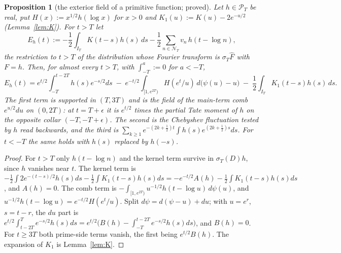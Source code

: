 \documentclass[11pt]{amsart}
\newtheorem{proposition}[theorem]{Proposition}
\theoremstyle{definition}
\theoremstyle{remark}
\newcommand{\PT}{\mathcal P_T}
\newcommand{\IT}{I_T}
\newcommand{\sT}{\sigma_T}
\newcommand{\Fh}{\widehat F}
\newcommand{\NT}{\mathcal N_T}
\begin{document}
\begin{proposition}[the exterior field of a primitive function; proved]\label{prop:shape-ext}
Let $h\in\PT$ be real, put $H(x):=x^{1/2}h(\log x)$ for $x>0$ and $K_1(u):=K(u)-2e^{-u/2}$ (Lemma~\ref{lem:K}). For $t>T$ let
\[
E_h(t):=-\frac12\int_{\IT}K(t-s)h(s)\,ds-\frac12\sum_{n\in\NT}v_n\,h(t-\log n),
\]
the restriction to $t>T$ of the distribution whose Fourier transform is $\sT\Fh$ with $F=h$. Then, for almost every $t>T$, with $\int_{-T}^{a}:=0$ for $a<-T$,
\[
E_h(t)=e^{t/2}\int_{-T}^{t-2T}h(s)e^{-s/2}ds\;-\;e^{-t/2}\int_{[1,e^{2T})}H(e^t/u)\,d\big(\psi(u)-u\big)\;-\;\frac12\int_{\IT}K_1(t-s)h(s)\,ds .
\]
The first term is supported in $(T,3T)$ and is the field of the main-term comb $e^{u/2}du$ on $(0,2T)$: at $t=T+\epsilon$ it is
$e^{t/2}$ times the partial Tate moment of $h$ on the opposite collar $(-T,-T+\epsilon)$. The second is the Chebyshev fluctuation tested
by $h$ read backwards, and the third is $\sum_{k\ge1}e^{-(2k+\frac12)t}\int h(s)e^{(2k+\frac12)s}ds$. For $t<-T$ the same holds with $h(s)$
replaced by $h(-s)$.
\end{proposition}

\begin{proof}
For $t>T$ only $h(t-\log n)$ and the kernel term survive in $\sT(D)h$, since $h$ vanishes near $t$. The kernel term is
$-\frac12\int2e^{-(t-s)/2}h(s)ds-\frac12\int K_1(t-s)h(s)ds=-e^{-t/2}A(h)-\frac12\int K_1(t-s)h(s)ds$, and $A(h)=0$. The comb term is
$-\int_{[1,e^{2T})}u^{-1/2}h(t-\log u)\,d\psi(u)$, and $u^{-1/2}h(t-\log u)=e^{-t/2}H(e^t/u)$. Split $d\psi=d(\psi-u)+du$; with $u=e^r$,
$s=t-r$, the $du$ part is $e^{t/2}\int_{t-2T}^Te^{-s/2}h(s)ds=e^{t/2}\big(B(h)-\int_{-T}^{t-2T}e^{-s/2}h(s)ds\big)$, and $B(h)=0$. For
$t\ge3T$ both prime-side terms vanish, the first being $e^{t/2}B(h)$. The expansion of $K_1$ is Lemma~\ref{lem:K}.
\end{proof}
\end{document}
